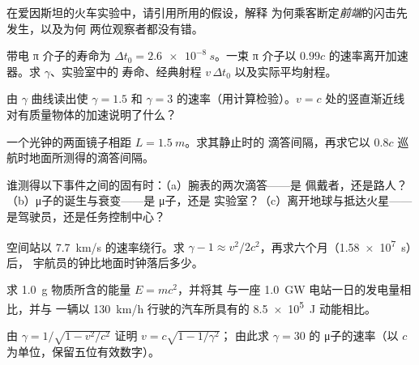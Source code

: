 \begin{exercise}[$\star$]\label{exo:g12:special-relativity:5}
在爱因斯坦的火车实验中，请引用所用的假设，解释
为何乘客断定\emph{前端}的闪击先发生，以及为何
两位观察者都没有错。
\end{exercise}

\begin{exercise}[$\star\star$]\label{exo:g12:special-relativity:6}
带电 π 介子的寿命为 $\Delta t_0 = \qty{2.6e-8}{s}$。一束
π 介子以 $0.99c$ 的速率离开加速器。求 $\gamma$、实验室中的
寿命、经典射程 $v\,\Delta t_0$ 以及实际平均射程。
\end{exercise}

\begin{exercise}[$\star\star$]\label{exo:g12:special-relativity:7}
由 $\gamma$ 曲线读出使 $\gamma = 1.5$ 和
$\gamma = 3$ 的速率（用计算检验）。$v = c$ 处的竖直渐近线
对有质量物体的加速说明了什么？
\end{exercise}

\begin{exercise}[$\star\star$]\label{exo:g12:special-relativity:8}
一个光钟的两面镜子相距 $L = \qty{1.5}{m}$。求其静止时的
滴答间隔，再求它以 $0.8c$ 巡航时地面所测得的滴答间隔。
\end{exercise}

\begin{exercise}[$\star\star$]\label{exo:g12:special-relativity:9}
谁测得以下事件之间的固有时：（a）腕表的两次滴答——是
佩戴者，还是路人？（b）μ子的诞生与衰变——是 μ子，还是
实验室？（c）离开地球与抵达火星——是驾驶员，还是任务控制中心？
\end{exercise}

\begin{exercise}[$\star\star$]\label{exo:g12:special-relativity:10}
空间站以 \qty{7.7}{km/s} 的速率绕行。求
$\gamma - 1 \approx v^2/2c^2$，再求六个月（\qty{1.58e7}{s}）后，
宇航员的钟比地面时钟落后多少。
\end{exercise}

\begin{exercise}[$\star\star$]\label{exo:g12:special-relativity:11}
求 \qty{1.0}{g} 物质所含的能量 $E = mc^2$，并将其
与一座 \qty{1.0}{GW} 电站一日的发电量相比，并与
一辆以 \qty{130}{km/h} 行驶的汽车所具有的 \qty{8.5e5}{J} 动能相比。
\end{exercise}

\begin{exercise}[$\star\star\star$]\label{exo:g12:special-relativity:12}
由 $\gamma = 1/\sqrt{1 - v^2/c^2}$ 证明 $v = c\sqrt{1 - 1/\gamma^2}$；
由此求 $\gamma = 30$ 的 μ子的速率（以
$c$ 为单位，保留五位有效数字）。
\end{exercise}


